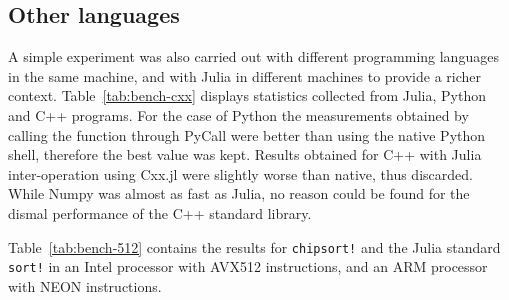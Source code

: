 \documentclass{juliacon}
\begin{document}
\subsection{Other languages}
A simple experiment was also carried out with different programming languages in the same machine, and with Julia in different machines to provide a richer context. Table~\ref{tab:bench-cxx} displays statistics collected from Julia, Python and C++ programs. For the case of Python the measurements obtained by calling the function through PyCall were better than using the native Python shell, therefore the best value was kept. Results obtained for C++ with Julia inter-operation using Cxx.jl were slightly worse than native, thus discarded. While Numpy was almost as fast as Julia, no reason could be found for the dismal performance of the C++ standard library.

\begin{table}[h]
\label{tab:bench-cxx}
\end{table}

Table~\ref{tab:bench-512} contains the results for {\tt chipsort!} and the Julia standard {\tt sort!} in an Intel processor with AVX512 instructions, and an ARM processor with NEON instructions.
\begin{table}[h]
\label{tab:bench-512}
\end{table}
\end{document}
